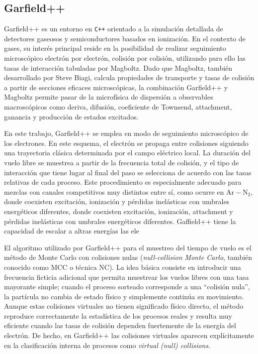 \documentclass[12pt,a4paper]{article}
\newcommand{\N}{\mathrm{N}}
\newcommand{\Ar}{\mathrm{Ar}}
\begin{document}
\subsection{Garfield++}

{Garfield++} es un entorno en \texttt{C++} orientado a la simulación detallada de detectores gaseosos y semiconductores basados en ionización. En el contexto de gases, su interés principal reside en la posibilidad de realizar seguimiento microscópico electrón por electrón, colisión por colisión, utilizando para ello las tasas de interacción tabuladas por {Magboltz}. Dado que {Magboltz}, también desarrollado por Steve Biagi, calcula propiedades de transporte y tasas de colisión a partir de secciones eficaces microscópicas, la combinación {Garfield++} y {Magboltz} permite pasar de la microfísica de dispersión a observables macroscópicos como deriva, difusión, coeficiente de Townsend, attachment, ganancia y producción de estados excitados.

En este trabajo, Garfield++ se emplea en modo de seguimiento microscópico de los electrones. En este esquema, el electrón se propaga entre colisiones siguiendo una trayectoria clásica determinada por el campo eléctrico local. La duración del vuelo libre se muestrea a partir de la frecuencia total de colisión, y el tipo de interacción que tiene lugar al final del paso se selecciona de acuerdo con las tasas relativas de cada proceso. Este procedimiento es especialmente adecuado para mezclas con canales competitivos muy distintos entre sí, como ocurre en $\Ar-\N_2$, donde coexisten excitación, ionización y pérdidas inelásticas con umbrales energéticos diferentes, donde coexisten excitación, ionización, attachment y pérdidas inelásticas con umbrales energéticos diferentes. Gaffield++ tiene la capacidad de escalar a altras energías las ele

El algoritmo utilizado por {Garfield++} para el muestreo del tiempo de vuelo es el método de Monte Carlo con colisiones nulas (\textit{null-collision Monte Carlo}, también conocido como MCC o técnica NC). La idea básica consiste en introducir una frecuencia ficticia adicional que permita muestrear los vuelos libres con una tasa mayorante simple; cuando el proceso sorteado corresponde a una ``colisión nula'', la partícula no cambia de estado físico y simplemente continúa su movimiento. Aunque estas colisiones virtuales no tienen significado físico directo, el método reproduce correctamente la estadística de los procesos reales y resulta muy eficiente cuando las tasas de colisión dependen fuertemente de la energía del electrón. De hecho, en {Garfield++} las colisiones virtuales aparecen explícitamente en la clasificación interna de procesos como \textit{virtual (null) collisions}.
\end{document}
